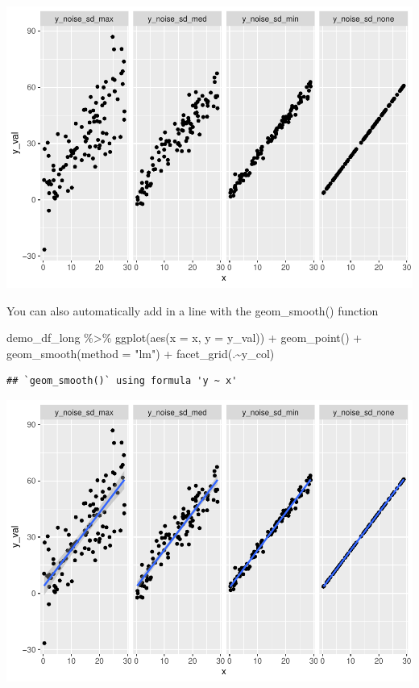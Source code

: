 \documentclass[
]{book}
\newenvironment{Shaded}{\begin{snugshade}}{\end{snugshade}}
\newcommand{\AttributeTok}[1]{\textcolor[rgb]{0.77,0.63,0.00}{#1}}
\newcommand{\FunctionTok}[1]{\textcolor[rgb]{0.00,0.00,0.00}{#1}}
\newcommand{\NormalTok}[1]{#1}
\newcommand{\SpecialCharTok}[1]{\textcolor[rgb]{0.00,0.00,0.00}{#1}}
\newcommand{\StringTok}[1]{\textcolor[rgb]{0.31,0.60,0.02}{#1}}
\begin{document}
\includegraphics{test_course_notes_files/figure-latex/remedy014-1.pdf}

You can also automatically add in a line with the geom\_smooth() function

\begin{Shaded}
\begin{Highlighting}[]
\NormalTok{demo\_df\_long }\SpecialCharTok{\%\textgreater{}\%} 
  \FunctionTok{ggplot}\NormalTok{(}\FunctionTok{aes}\NormalTok{(}\AttributeTok{x =}\NormalTok{ x, }\AttributeTok{y =}\NormalTok{ y\_val)) }\SpecialCharTok{+}
  \FunctionTok{geom\_point}\NormalTok{() }\SpecialCharTok{+}
  \FunctionTok{geom\_smooth}\NormalTok{(}\AttributeTok{method =} \StringTok{"lm"}\NormalTok{) }\SpecialCharTok{+} 
  \FunctionTok{facet\_grid}\NormalTok{(.}\SpecialCharTok{\textasciitilde{}}\NormalTok{y\_col)}
\end{Highlighting}
\end{Shaded}

\begin{verbatim}
## `geom_smooth()` using formula 'y ~ x'
\end{verbatim}

\includegraphics{test_course_notes_files/figure-latex/remedy015-1.pdf}
\end{document}
